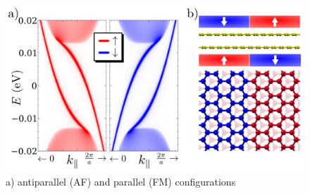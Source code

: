 \begin{figure}[h!]
\centering
\includegraphics{graphene_bilayer/figures/cri3_kink.pdf}
\vspace{-5pt}
\caption{a) antiparallel (AF) and parallel (FM) configurations}
\label{cri3}
\end{figure}













